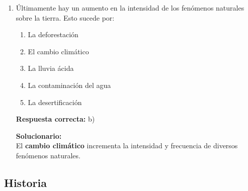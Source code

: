 \begin{enumerate}
	\vspace{2mm}
	\textbf{Solucionario:}\\
	El eje polar o axial también recibe el nombre de \textbf{eje terrestre}.
	
	\vspace{6mm}
	
	\item Últimamente hay un aumento en la intensidad de los fenómenos naturales sobre la tierra. Esto sucede por:
	\begin{enumerate}[label=\alph*)]
		\item La deforestación
		\item El cambio climático
		\item La lluvia ácida
		\item La contaminación del agua
		\item La desertificación
	\end{enumerate}
	\textbf{Respuesta correcta:} b)
	
	\vspace{2mm}
	\textbf{Solucionario:}\\
	El \textbf{cambio climático} incrementa la intensidad y frecuencia de diversos fenómenos naturales.
	
	\vspace{6mm}
	
\end{enumerate}

\subsection*{Historia}

